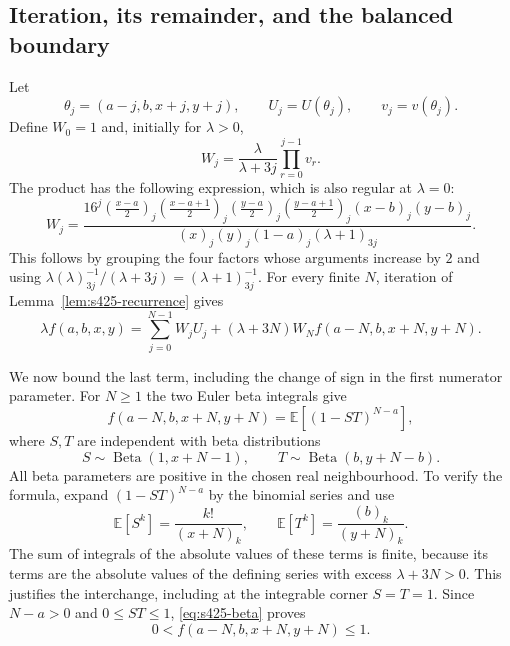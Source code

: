 \documentclass[11pt,a4paper]{article}
\theoremstyle{remark}\newtheorem{remark}[theorem]{Remark}
\numberwithin{equation}{section}
\begin{document}
\subsection{Iteration, its remainder, and the balanced boundary}
Let
\[
 \theta_j=(a-j,b,x+j,y+j),\qquad
 U_j=U(\theta_j),\qquad v_j=v(\theta_j).
\]
Define $W_0=1$ and, initially for $\lambda>0$,
\[
 W_j=\frac{\lambda}{\lambda+3j}\prod_{r=0}^{j-1}v_r.
\]
The product has the following expression, which is also regular at
$\lambda=0$:
\begin{equation}\label{eq:s425-W}
 W_j=
 \frac{16^j
 (\frac{x-a}{2})_j(\frac{x-a+1}{2})_j
 (\frac{y-a}{2})_j(\frac{y-a+1}{2})_j
 (x-b)_j(y-b)_j}
 {(x)_j(y)_j(1-a)_j(\lambda+1)_{3j}}.
\end{equation}
This follows by grouping the four factors whose arguments increase by
$2$ and using
$\lambda(\lambda)_{3j}^{-1}/(\lambda+3j)
=(\lambda+1)_{3j}^{-1}$.
For every finite $N$, iteration of Lemma~\ref{lem:s425-recurrence} gives
\begin{equation}\label{eq:s425-iteration}
 \lambda f(a,b,x,y)
 =\sum_{j=0}^{N-1}W_jU_j
   +(\lambda+3N)W_N f(a-N,b,x+N,y+N).
\end{equation}

We now bound the last term, including the change of sign in the first
numerator parameter. For $N\ge1$ the two Euler beta integrals give
\begin{equation}\label{eq:s425-beta}
 f(a-N,b,x+N,y+N)=\mathbb E[(1-ST)^{N-a}],
\end{equation}
where $S,T$ are independent with beta distributions
\[
 S\sim\operatorname{Beta}(1,x+N-1),\qquad
 T\sim\operatorname{Beta}(b,y+N-b).
\]
All beta parameters are positive in the chosen real neighbourhood.
To verify the formula, expand $(1-ST)^{N-a}$ by the binomial series
and use
\[
 \mathbb E[S^k]=\frac{k!}{(x+N)_k},\qquad
 \mathbb E[T^k]=\frac{(b)_k}{(y+N)_k}.
\]
The sum of integrals of the absolute values of these terms is finite,
because its terms are the absolute values of the defining series with
excess $\lambda+3N>0$. This justifies the interchange, including at the
integrable corner $S=T=1$.
Since $N-a>0$ and $0\le ST\le1$, \eqref{eq:s425-beta} proves
\begin{equation}\label{eq:s425-fN}
 0<f(a-N,b,x+N,y+N)\le1.
\end{equation}
\end{document}
